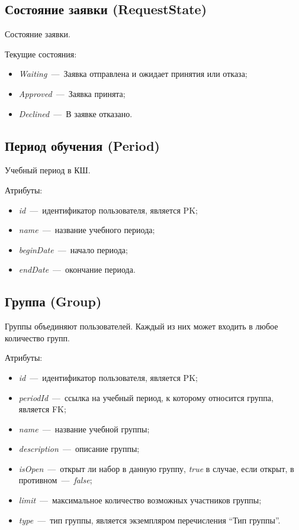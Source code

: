 \documentclass[14pt]{article}
\begin{document}

\subsection{Состояние заявки (RequestState)}

Состояние заявки.

Текущие состояния:
\begin{itemize}
	\item \emph{Waiting}~---~Заявка отправлена и ожидает принятия или отказа;
	\item \emph{Approved}~---~Заявка принята;
	\item \emph{Declined}~---~В заявке отказано.
\end{itemize}

\subsection{Период обучения (Period)}

Учебный период в КШ.

Атрибуты:
\begin{itemize}
	\item \emph{id}~---~идентификатор пользователя, является PK;
	\item \emph{name}~---~название учебного периода;
	\item \emph{beginDate}~---~начало периода;
	\item \emph{endDate}~---~окончание периода.
\end{itemize}
	
\subsection{Группа (Group)}

Группы объединяют пользователей. Каждый из них может входить в любое количество групп.

Атрибуты:
\begin{itemize}
	\item \emph{id}~---~идентификатор пользователя, является PK;
	\item \emph{periodId}~---~ссылка на учебный период, к которому относится группа, является FK;
	\item \emph{name}~---~название учебной группы;
	\item \emph{description}~---~описание группы;
	\item \emph{isOpen}~---~открыт ли набор в данную группу, \emph{true} в случае, если открыт, в противном~---~\emph{false};
	\item \emph{limit}~---~максимальное количество возможных участников группы;	
	\item \emph{type}~---~тип группы, является экземпляром перечисления ``Тип группы''.
\end{itemize}
\end{document}
